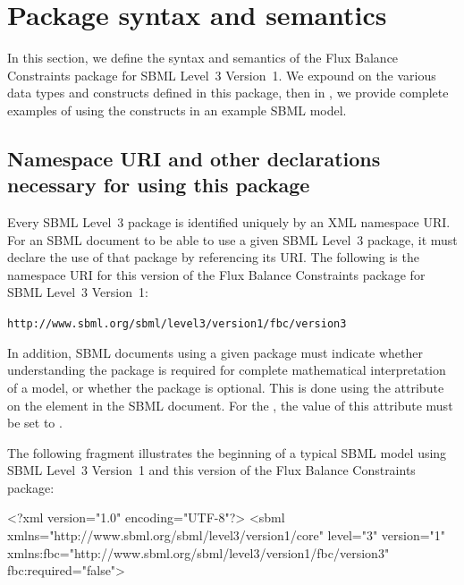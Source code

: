 
\section{Package syntax and semantics}
\label{syntax}

In this section, we define the syntax and semantics of the Flux Balance
Constraints package for SBML Level~3 Version~1.  We expound on the various
data types and constructs defined in this package, then in ,
we provide complete examples of using the constructs in an example SBML
model.

\subsection{Namespace URI and other declarations necessary for using this
package}
\label{xml-namespace}

Every SBML Level~3 package is identified uniquely by an XML namespace URI.
For an SBML document to be able to use a given SBML Level~3 package, it
must declare the use of that package by referencing its URI.  The following
is the namespace URI for this version of the Flux Balance Constraints
package for SBML Level~3 Version~1:
\begin{center}
\texttt{http://www.sbml.org/sbml/level3/version1/fbc/version3}
\end{center}


In addition, SBML documents using a given package must indicate whether
understanding the package is required for complete mathematical interpretation
of a model, or whether the package is optional.  This is done using the
attribute  on the  element in the SBML document.
For the \FBCPackage, the value of this attribute must be set to .

The following fragment illustrates the beginning of a typical SBML model
using SBML Level~3 Version~1 and this version of the Flux Balance
Constraints package:

\begin{example}
<?xml version="1.0" encoding="UTF-8"?>
<sbml xmlns="http://www.sbml.org/sbml/level3/version1/core" level="3" version="1"
   xmlns:fbc="http://www.sbml.org/sbml/level3/version1/fbc/version3" fbc:required="false">
\end{example}

